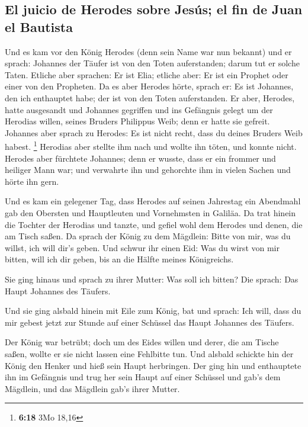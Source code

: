 \hypertarget{el-juicio-de-herodes-sobre-jesuxfas-el-fin-de-juan-el-bautista}{%
\subsection{El juicio de Herodes sobre Jesús; el fin de Juan el
Bautista}\label{el-juicio-de-herodes-sobre-jesuxfas-el-fin-de-juan-el-bautista}}

 Und es kam vor den König Herodes (denn sein Name war nun
bekannt) und er sprach: Johannes der Täufer ist von den Toten
auferstanden; darum tut er solche Taten.  Etliche aber
sprachen: Er ist Elia; etliche aber: Er ist ein Prophet oder einer von
den Propheten.  Da es aber Herodes hörte, sprach er: Es
ist Johannes, den ich enthauptet habe; der ist von den Toten
auferstanden.  Er aber, Herodes, hatte ausgesandt und
Johannes gegriffen und ins Gefängnis gelegt um der Herodias willen,
seines Bruders Philippus Weib; denn er hatte sie gefreit.
 Johannes aber sprach zu Herodes: Es ist nicht recht,
dass du deines Bruders Weib habest. \footnote{\textbf{6:18} 3Mo 18,16}
 Herodias aber stellte ihm nach und wollte ihn töten, und
konnte nicht.  Herodes aber fürchtete Johannes; denn er
wusste, dass er ein frommer und heiliger Mann war; und verwahrte ihn und
gehorchte ihm in vielen Sachen und hörte ihn gern.

 Und es kam ein gelegener Tag, dass Herodes auf seinen
Jahrestag ein Abendmahl gab den Obersten und Hauptleuten und Vornehmsten
in Galiläa.  Da trat hinein die Tochter der Herodias und
tanzte, und gefiel wohl dem Herodes und denen, die am Tisch saßen. Da
sprach der König zu dem Mägdlein: Bitte von mir, was du willst, ich will
dir's geben.  Und schwur ihr einen Eid: Was du wirst von
mir bitten, will ich dir geben, bis an die Hälfte meines Königreichs.

 Sie ging hinaus und sprach zu ihrer Mutter: Was soll ich
bitten? Die sprach: Das Haupt Johannes des Täufers.

 Und sie ging alsbald hinein mit Eile zum König, bat und
sprach: Ich will, dass du mir gebest jetzt zur Stunde auf einer Schüssel
das Haupt Johannes des Täufers.

 Der König war betrübt; doch um des Eides willen und
derer, die am Tische saßen, wollte er sie nicht lassen eine Fehlbitte
tun.  Und alsbald schickte hin der König den Henker und
hieß sein Haupt herbringen. Der ging hin und enthauptete ihn im
Gefängnis  und trug her sein Haupt auf einer Schüssel und
gab's dem Mägdlein, und das Mägdlein gab's ihrer Mutter.

